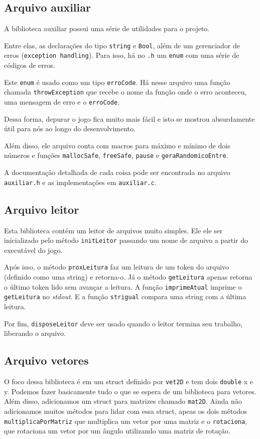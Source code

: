 \documentclass[12pt, a4paper]{article}
\begin{document}
    \subsection{Arquivo auxiliar}
        A biblioteca auxiliar possui uma série de utilidades para o projeto.

        Entre elas, as declarações do tipo \texttt{string} e \texttt{Bool}, além de
        um gerenciador de erros (\texttt{exception handling}). Para isso, 
        há no \texttt{.h} um \texttt{enum} com uma série de códigos de erros.

        Este \texttt{enum} é usado como um tipo \texttt{erroCode}. Há nesse arquivo
        uma função chamada \texttt{throwException} que recebe o nome da função 
        onde o erro aconteceu, uma mensagem de erro e o \texttt{erroCode}.

        Dessa forma, depurar o jogo fica muito mais fácil e isto se mostrou
        absurdamente útil para nós ao longo do desenvolvimento.

        Além disso, ele arquivo conta com macros para máximo e mínimo de dois números e funções
        \texttt{mallocSafe}, \texttt{freeSafe}, \texttt{pause} e \texttt{geraRandomicoEntre}.

        A documentação detalhada de cada coisa pode ser encontrada no arquivo 
        \texttt{auxiliar.h} e as implementações em \texttt{auxiliar.c}.

    \subsection{Arquivo leitor}
        Esta biblioteca contém um leitor de arquivos muito simples. Ele ele
        ser inicializado pelo método \texttt{initLeitor} passando um
        nome de arquivo a partir do executável do jogo.

        Após isso, o método \texttt{proxLeitura} faz um leitura de um token
        do arquivo (definido como uma string) e retorna-o. Já o método
        \texttt{getLeitura} apenas retorna o último token lido sem avançar
        a leitura.
        A função \texttt{imprimeAtual} imprime o \texttt{getLeitura} no
        \textit{stdout}. E a função \texttt{strigual} compara uma string 
        com a última leitura.

        Por fim, \texttt{disposeLeitor} deve ser usado quando o leitor termina 
        seu trabalho, liberando o arquivo.

    \subsection{Arquivo vetores}
        O foco dessa biblioteca é em um struct definido por \texttt{vet2D} e tem
        dois \texttt{double} x e y. Podemos fazer basicamente tudo o que se espera
        de um biblioteca para vetores. Além disso, adicionamos um struct
        para matrizes chamado \texttt{mat2D}. Ainda não adicionamos muitos métodos
        para lidar com essa struct, apeas os dois métodos \texttt{multiplicaPorMatriz}
        que multiplica um vetor por uma matriz e o \texttt{rotaciona},
        que rotaciona um vetor por um ângulo utilizando uma matriz de rotação.
\end{document}
